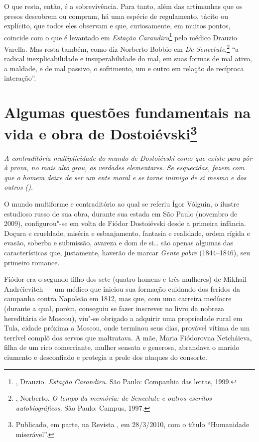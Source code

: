 O que resta, então, é a sobrevivência. Para tanto, além das
artimanhas que os presos descobrem ou compram, há uma espécie
de regulamento, tácito ou explícito, que todos eles observam e
que, curiosamente, em muitos pontos, coincide com o que é
levantado em \emph{Estação Carandiru}\footnote{, Drauzio.
\emph{Estação Carandiru}. São Paulo: Companhia das letras, 1999.} pelo
médico Drauzio Varella. Mas resta também, como diz Norberto Bobbio em
\emph{De Senectute},\footnote{, Norberto.
\emph{O tempo da memória: de Senectute e outros escritos
autobiográficos}. São Paulo: Campus, 1997.} ``a radical
inexplicabilidade e insuperabilidade do mal, em suas formas
de mal ativo, a maldade, e de mal passivo, o sofrimento, um
e outro em relação de recíproca interação''.

\chapter{Algumas questões fundamentais na vida e obra de Dostoiévski\footnote{Publicado, em parte, na Revista \protect{}, em 28/3/2010, com o título ``Humanidade miserável''.}}
\label{questoesfundamentais}

\begin{flushright}
\parbox{180pt}{\small\emph{A contraditória multiplicidade do mundo de Dostoiévski como
que existe para pôr à prova, no mais alto grau, as verdades
elementares. Se esquecidas, fazem com que o homem deixe de
ser um ente moral e se torne inimigo de si mesmo e dos
outros ().}}
\end{flushright}


O mundo multiforme e contraditório ao qual se referiu
Ígor Vólguin, o ilustre estudioso russo de sua obra, durante sua
estada em São Paulo (novembro de 2009), configurou"-se em volta
de Fiódor Dostoiévski desde a primeira infância. Doçura e
crueldade, miséria e esbanjamento, fantasia e realidade,
ordem rígida e evasão, soberba e submissão, avareza e dom
de si\ldots{} são apenas algumas das características que,
justamente, haverão de marcar \emph{Gente pobre} (1844--1846),
seu primeiro romance.

Fiódor era o segundo filho dos sete (quatro homens e três
mulheres) de Mikhail Andréievitch --- um médico que iniciou
sua formação cuidando dos feridos da campanha contra Napoleão
em 1812, mas que, com uma carreira medíocre (durante a qual,
porém, conseguiu se fazer inscrever no livro da nobreza
hereditária de Moscou), viu"-se obrigado a adquirir uma propriedade rural
em Tula, cidade próxima a Moscou, onde terminou seus dias,
provável vítima de um terrível complô dos servos que
maltratava. A mãe, Maria Fiódorovna Netcháieva, filha de um
rico comerciante, mulher sensata e generosa, abrandava o
marido ciumento e desconfiado e protegia a prole dos ataques do
consorte.

